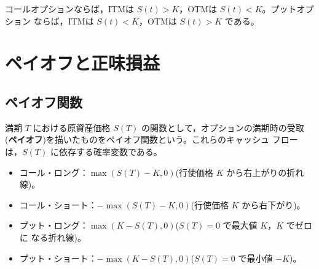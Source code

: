コールオプションならば，ITMは $S(t) > K$，OTMは $S(t) < K$。プットオプション
ならば，ITMは $S(t) < K$，OTMは $S(t) > K$ である。

\section{ペイオフと正味損益}

\subsection{ペイオフ関数}

満期 $T$ における原資産価格 $S(T)$ の関数として，オプションの満期時の受取
(\textbf{ペイオフ})を描いたものをペイオフ関数という。これらのキャッシュ
フローは，$S(T)$ に依存する確率変数である。

\begin{itemize}
\item コール・ロング：$\max(S(T)-K, 0)$(行使価格 $K$ から右上がりの折れ線)。
\item コール・ショート：$-\max(S(T)-K, 0)$(行使価格 $K$ から右下がり)。
\item プット・ロング：$\max(K-S(T), 0)$($S(T)=0$ で最大値 $K$，$K$ でゼロに
なる折れ線)。
\item プット・ショート：$-\max(K-S(T), 0)$($S(T)=0$ で最小値 $-K$)。
\end{itemize}

